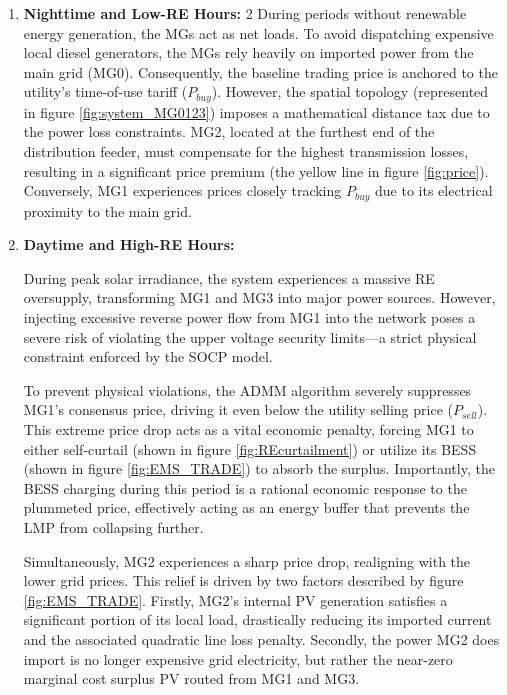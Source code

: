 \documentclass[preprint,12pt]{elsarticle}
\begin{document}
    \begin{enumerate}
        \item \textbf{Nighttime and Low-RE Hours:}
        2
        During periods without renewable energy generation, the MGs act as net loads. To avoid dispatching expensive local diesel generators, the MGs rely heavily on imported power from the main grid (MG0). Consequently, the baseline trading price is anchored to the utility's time-of-use tariff ($P_{buy}$). However, the spatial topology (represented in figure \ref{fig:system_MG0123}) imposes a mathematical distance tax due to the power loss constraints. MG2, located at the furthest end of the distribution feeder, must compensate for the highest transmission losses, resulting in a significant price premium (the yellow line in figure \ref{fig:price}). Conversely, MG1 experiences prices closely tracking $P_{buy}$ due to its electrical proximity to the main grid.
        \item \textbf{Daytime and High-RE Hours:}

        During peak solar irradiance, the system experiences a massive RE oversupply, transforming MG1 and MG3 into major power sources. However, injecting excessive reverse power flow from MG1 into the network poses a severe risk of violating the upper voltage security limits—a strict physical constraint enforced by the SOCP model.

        To prevent physical violations, the ADMM algorithm severely suppresses MG1's consensus price, driving it even below the utility selling price ($P_{sell}$). This extreme price drop acts as a vital economic penalty, forcing MG1 to either self-curtail (shown in figure \ref{fig:REcurtailment}) or utilize its BESS (shown in figure \ref{fig:EMS_TRADE}) to absorb the surplus. Importantly, the BESS charging during this period is a rational economic response to the plummeted price, effectively acting as an energy buffer that prevents the LMP from collapsing further.

        Simultaneously, MG2 experiences a sharp price drop, realigning with the lower grid prices. This relief is driven by two factors described by figure \ref{fig:EMS_TRADE}. Firstly, MG2's internal PV generation satisfies a significant portion of its local load, drastically reducing its imported current and the associated quadratic line loss penalty. Secondly, the power MG2 does import is no longer expensive grid electricity, but rather the near-zero marginal cost surplus PV routed from MG1 and MG3.
    \end{enumerate}
\end{document}
